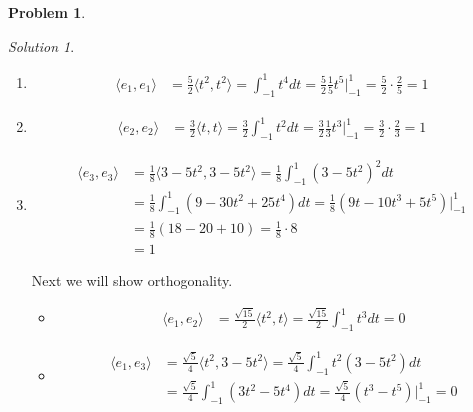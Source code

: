 \documentclass[12pt,a4paper]{article}
\theoremstyle{definition}
\newtheorem{problem}{Problem}
\theoremstyle{remark}
\newtheorem*{solution}{Solution}
\begin{document}
\begin{problem}
\begin{enumerate}
\begin{solution}
            \begin{enumerate}
                \item \begin{align*}
                    \langle e_1, e_1 \rangle &= \frac{5}{2} \langle t^2, t^2 \rangle = \int_{-1}^1 t^4 dt = \frac{5}{2} \frac{1}{5} t^5 \Bigg|_{-1}^1 = \frac{5}{2} \cdot \frac{2}{5} = 1
                \end{align*}
                \item \begin{align*}
                    \langle e_2, e_2 \rangle &= \frac{3}{2} \langle t, t \rangle = \frac{3}{2} \int_{-1}^1 t^2 dt = \frac{3}{2} \frac{1}{3} t^3 \Bigg|_{-1}^1 = \frac{3}{2} \cdot \frac{2}{3} = 1
                \end{align*}
                \item \begin{align*}
                    \langle e_3, e_3 \rangle &= \frac{1}{8} \langle 3-5t^2, 3-5t^2 \rangle = \frac{1}{8} \int_{-1}^1 \left( 3-5t^2 \right)^2 dt \\&= \frac{1}{8} \int_{-1}^1 \left(9 - 30 t^2 + 25 t^4 \right)dt = \frac{1}{8}\left(9t - 10 t^3 + 5 t^5 \right)\Bigg|_{-1}^1 \\
                    &= \frac{1}{8}\left(18 - 20 + 10\right) = \frac{1}{8} \cdot 8 \\
                    &= 1
                \end{align*}

                Next we will show orthogonality. 

                \begin{itemize}
                    \item \begin{align*}
                        \langle e_1, e_2 \rangle &= \frac{\sqrt{15}}{2} \langle t^2, t \rangle = \frac{\sqrt{15}}{2} \int_{-1}^1 t^3 dt = 0
                    \end{align*}

                    \item \begin{align*}
                        \langle e_1, e_3 \rangle &= \frac{\sqrt{5}}{4} \langle t^2, 3-5t^2 \rangle = \frac{\sqrt{5}}{4} \int_{-1}^1 t^2(3-5t^2) dt \\
                        &= \frac{\sqrt{5}}{4} \int_{-1}^1 \left(3t^2 - 5t^4 \right) dt = \frac{\sqrt{5}}{4} \left(t^3 - t^5 \right)\Bigg|_{-1}^1 = 0
                    \end{align*}


\end{itemize}
\end{enumerate}
\end{solution}
\end{enumerate}
\end{problem}
\end{document}
